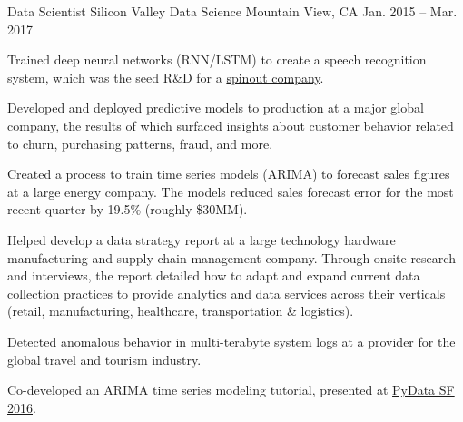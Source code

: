 \begin{cventries}
  \cventry
    {Data Scientist} %
    {Silicon Valley Data Science} %
    {Mountain View, CA} %
    {Jan. 2015 -- Mar. 2017} %
    {
      \begin{cvitems} %
        \item {Trained deep neural networks (RNN/LSTM) to create a speech recognition system, which was the seed R\&D for a {\href{https://www.lexicon.ai}{spinout company}}.} %
        \item {Developed and deployed predictive models to production at a major global company, the results of which surfaced insights about customer behavior related to churn, purchasing patterns, fraud, and more.} %
        \item {Created a process to train time series models (ARIMA) to forecast sales figures at a large energy company. The models reduced sales forecast error for the most recent quarter by 19.5\% (roughly \$30MM).} %
        \item {Helped develop a data strategy report at a large technology hardware manufacturing and supply chain management company. Through onsite research and interviews, the report detailed how to adapt and expand current data collection practices to provide analytics and data services across their verticals (retail, manufacturing, healthcare, transportation \& logistics).} %
        \item {Detected anomalous behavior in multi-terabyte system logs at a provider for the global travel and tourism industry.} %
        \item {Co-developed an ARIMA time series modeling tutorial, presented at {\href{https://pydata.org/sfo2016/schedule/presentation/38/}{PyData SF 2016}}.}
      \end{cvitems}
    }


\end{cventries}
